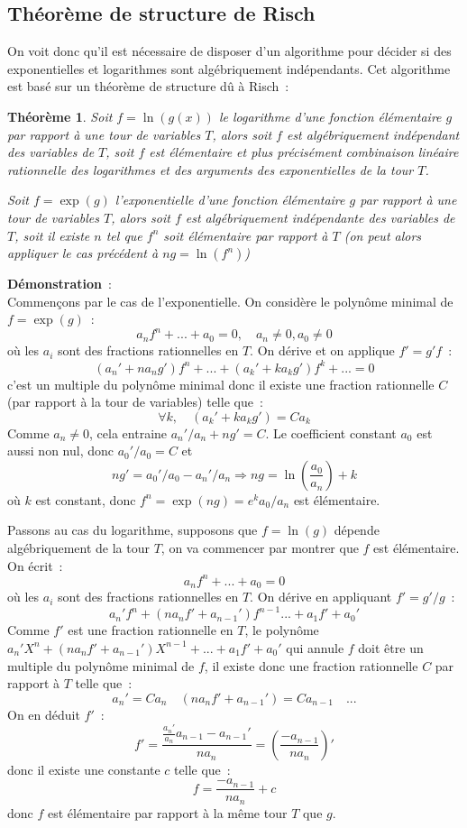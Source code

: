 \documentclass[a4paper,11pt]{book}
\newtheorem{thm}{Théorème}
\begin{document}
\begin{giacjshere}
\subsection{Théorème de structure de Risch}
On voit donc qu'il est nécessaire de disposer d'un algorithme
pour décider si des exponentielles et logarithmes sont
algébriquement indépendants. Cet algorithme est basé sur
un théorème de structure dû à Risch~:
\begin{thm}
Soit $f=\ln(g(x))$ le logarithme d'une fonction élémentaire
$g$ par rapport à une tour de variables $T$, alors soit $f$
est algébriquement indépendant des variables de $T$, soit $f$ est
élémentaire et plus précisément combinaison linéaire rationnelle
des logarithmes et des arguments des exponentielles de la tour $T$.

Soit $f=\exp(g)$ l'exponentielle d'une fonction élémentaire $g$
par rapport à une tour de variables $T$, alors soit $f$
est algébriquement indépendante des variables de $T$, soit
il existe $n$ tel que $f^n$ soit élémentaire par rapport à $T$ 
(on peut alors appliquer le cas précédent à $ng=\ln(f^n)$)
\end{thm}

{\bf Démonstration}~:\\
Commençons par le cas de l'exponentielle. On considère le polynôme minimal
de $f=\exp(g)$~:
\[ a_n f^n+...+a_0=0, \quad a_n \neq 0 , a_0 \neq 0\]
où les $a_i$ sont des fractions rationnelles en $T$. On dérive
et on applique $f'=g'f$~:
\[ (a_n'+n a_n g') f^n +   ... + ( a_{k}' + ka_k g')f^{k} +... =0\]
c'est un multiple du polynôme minimal donc il existe une fraction rationnelle
$C$ (par rapport à la tour de variables) telle que~:
\[ \forall k, \quad (a_k'+k a_k g') = C a_k\]
Comme $a_n\neq 0$, cela entraine $a_n'/a_n+ng'=C$. Le coefficient
constant $a_0$ est aussi non nul, donc $a_0'/a_0=C$ et 
\[ n g' = a_0'/a_0 - a_n'/a_n \Rightarrow ng=\ln(\frac{a_0}{a_n}) + k\]
où $k$ est constant, donc $f^n=\exp(ng)=e^k a_0/a_n$ est élémentaire.

Passons au cas du logarithme, supposons que $f=\ln(g)$ dépende
algébriquement de la tour $T$, on va commencer par montrer que
$f$ est élémentaire. On écrit~:
\[ a_n f^n+...+a_0=0\]
où les $a_i$ sont des fractions rationnelles en $T$. On dérive en
appliquant $f'=g'/g$~:
\[ a_n' f^n + (n a_n f' + a_{n-1}')f^{n-1}  ... + a_1 f'+a_0 '\]
Comme $f'$ est une fraction rationnelle en $T$, le polynôme
$a_n' X^n + (n a_n f'+a_{n-1}') X^{n-1}+...+ a_1 f'+a_0'$ qui annule $f$
doit être un multiple du polynôme minimal de $f$, il existe donc
une fraction rationnelle $C$ par rapport à $T$ telle que~:
\[ a_n' = C a_n \quad (n a_n f'+a_{n-1}') = C a_{n-1} \quad ... \]
On en déduit $f'$~:
\[ f'=\frac{\frac{a_n'}{a_n} a_{n-1}-a_{n-1}'}{n a_n} = 
\left(\frac{-a_{n-1}}{n a_n}\right)'\]
donc il existe une constante $c$ telle que~:
\[ f=\frac{-a_{n-1}}{n a_n}+c\]
donc $f$ est élémentaire par rapport à la même tour $T$ que $g$.


\end{giacjshere}
\end{document}
